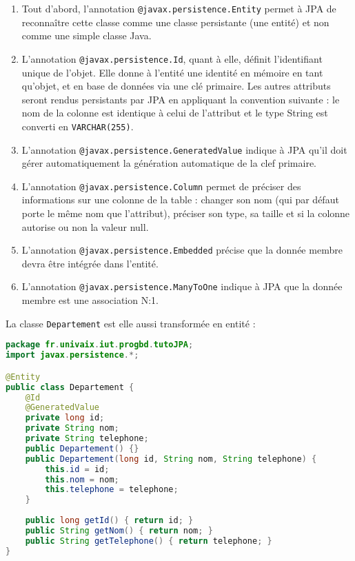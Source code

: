 \documentclass[a4paper,11pt]{article}
\begin{document}
\begin{enumerate}
	\item Tout d'abord, l'annotation \texttt{@javax.persistence.Entity} permet à JPA de reconnaître cette classe comme une 
	classe persistante (une entité) et non comme une simple classe Java.
	\item L'annotation \texttt{@javax.persistence.Id}, quant à elle, définit l'identifiant unique de l'objet. Elle donne à 
	l'entité une identité en mémoire en tant qu'objet, et en base de données via une clé primaire. Les autres attributs 
	seront rendus persistants par JPA en appliquant la convention suivante : le nom de la colonne est identique à celui de 
	l'attribut et le type String est converti en \texttt{VARCHAR(255)}.
	\item L'annotation \texttt{@javax.persistence.GeneratedValue} indique à JPA qu'il doit gérer automatiquement la 
	génération automatique de la clef primaire. 
	\item L'annotation \texttt{@javax.persistence.Column} permet de préciser des informations sur une colonne de la table : 
	changer son nom (qui par défaut porte le même nom que l’attribut), préciser son type, sa taille et si la colonne 
	autorise ou non la valeur null.
	\item L'annotation \texttt{@javax.persistence.Embedded} précise que la donnée membre devra être intégrée dans l'entité. 
	\item L'annotation \texttt{@javax.persistence.ManyToOne} indique à JPA que la donnée membre est une association N:1.
\end{enumerate}

La classe \texttt{Departement} est elle aussi transformée en entité :
\begin{lstlisting}[language=Java,style=customjava]
package fr.univaix.iut.progbd.tutoJPA;
import javax.persistence.*;

@Entity
public class Departement {
	@Id
	@GeneratedValue
	private long id;
	private String nom;
	private String telephone;
	public Departement() {}
	public Departement(long id, String nom, String telephone) {
		this.id = id;
		this.nom = nom;
		this.telephone = telephone;
	}
	
	public long getId() { return id; }
	public String getNom() { return nom; }
	public String getTelephone() { return telephone; }
}

\end{lstlisting}
\end{document}
